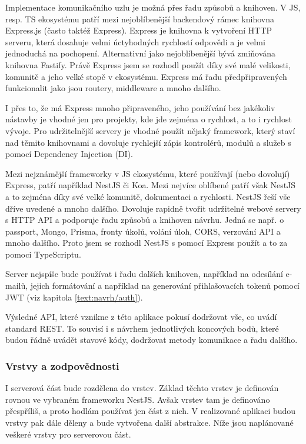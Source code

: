 Implementace komunikačního uzlu je možná přes řadu způsobů a knihoven.
V JS, resp. TS ekosystému patří mezi nejoblíbenější backendový rámec knihovna Express.js (často taktéž Express).
Express je knihovna k vytvoření HTTP serveru, která dosahuje velmi úctyhodných rychlostí odpovědi a je velmi jednoduchá na pochopení.
Alternativní jako nejoblíbenější bývá zmiňována knihovna Fastify.
Právě Express jsem se rozhodl použít díky své malé velikosti, komunitě a jeho velké stopě v ekosystému.
Express má řadu předpřipravených funkcionalit jako jsou routery, middleware a mnoho dalšího.

I přes to, že má Express mnoho připraveného, jeho používání bez jakékoliv nástavby je vhodné jen pro projekty, kde jde zejména o rychlost, a to i rychlost vývoje.
Pro udržitelnější servery je vhodné použít nějaký framework, který staví nad těmito knihovnami a dovoluje rychlejší zápis kontrolérů, modulů a služeb s pomocí Dependency Injection (DI).

Mezi nejznámější frameworky v JS ekosystému, které používají (nebo dovolují) Express, patří například NestJS či Koa.
Mezi nejvíce oblíbené patří však NestJS a to zejména díky své velké komunitě, dokumentaci a rychlosti.
NestJS řeší vše dříve uvedené a mnoho dalšího.
Dovoluje rapidně tvořit udržitelné webové servery s HTTP API a podporuje řadu způsobů a knihoven návrhu.
Jedná se např. o passport, Mongo, Prisma, fronty úkolů, volání úloh, CORS, verzování API a mnoho dalšího.
Proto jsem se rozhodl NestJS s pomocí Express použít a to za pomoci TypeScriptu.

Server nejspíše bude používat i řadu dalších knihoven, například na odesílání e-mailů, jejich formátování a například na generování přihlašovacích tokenů pomocí JWT (viz kapitola \ref{text:navrh/auth}).

Výsledné API, které vznikne z této aplikace pokusí dodržovat vše, co uvádí standard REST.
To souvisí i s návrhem jednotlivých koncových bodů, které budou řádně uvádět stavové kódy, dodržovat metody komunikace a řadu dalšího.

\subsubsection{Vrstvy a zodpovědnosti}

I serverová část bude rozdělena do vrstev. 
Základ těchto vrstev je definován rovnou ve vybraném frameworku NestJS.
Avšak vrstev tam je definováno přespříliš, a proto hodlám používat jen část z nich.
V realizované aplikaci budou vrstvy pak dále děleny a bude vytvořena další abstrakce.
Níže jsou naplánované veškeré vrstvy pro serverovou část.

